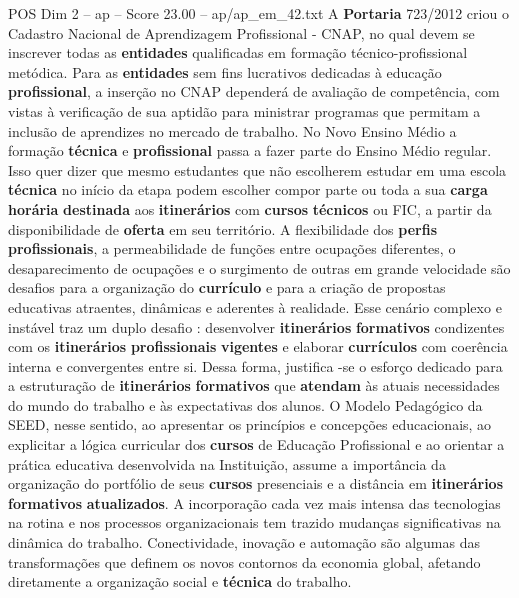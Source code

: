 \begin{textsample}{POS Dim 2 – ap – Score 23.00 – ap/ap\_em\_42.txt}  \label{ex:f2_pos_146}
A \textbf{Portaria} 723/2012 criou o Cadastro Nacional de Aprendizagem Profissional - CNAP, no qual devem se inscrever todas as \textbf{entidades} qualificadas em formação técnico-profissional metódica.
Para as \textbf{entidades} sem fins lucrativos dedicadas à educação \textbf{profissional}, a inserção no CNAP dependerá de avaliação de competência, com vistas à verificação de sua aptidão para ministrar programas que permitam a inclusão de aprendizes no mercado de trabalho.
No Novo Ensino Médio a formação \textbf{técnica} e \textbf{profissional} passa a fazer parte do Ensino Médio regular.
Isso quer dizer que mesmo estudantes que não escolherem estudar em uma escola \textbf{técnica} no início da etapa podem escolher compor parte ou toda a sua \textbf{carga} \textbf{horária} \textbf{destinada} aos \textbf{itinerários} com \textbf{cursos} \textbf{técnicos} ou FIC, a partir da disponibilidade de \textbf{oferta} em seu território.
A flexibilidade dos \textbf{perfis} \textbf{profissionais}, a permeabilidade de funções entre ocupações diferentes, o desaparecimento de ocupações e o surgimento de outras em grande velocidade são desafios para a organização do \textbf{currículo} e para a criação de propostas educativas atraentes, dinâmicas e aderentes à realidade.
Esse cenário complexo e instável traz um duplo desafio : desenvolver \textbf{itinerários} \textbf{formativos} condizentes com os \textbf{itinerários} \textbf{profissionais} \textbf{vigentes} e elaborar \textbf{currículos} com coerência interna e convergentes entre si.
Dessa forma, justifica -se o esforço dedicado para a estruturação de \textbf{itinerários} \textbf{formativos} que \textbf{atendam} às atuais necessidades do mundo do trabalho e às expectativas dos alunos.
O Modelo Pedagógico da SEED, nesse sentido, ao apresentar os princípios e concepções educacionais, ao explicitar a lógica curricular dos \textbf{cursos} de Educação Profissional e ao orientar a prática educativa desenvolvida na Instituição, assume a importância da organização do portfólio de seus \textbf{cursos} presenciais e a distância em \textbf{itinerários} \textbf{formativos} \textbf{atualizados}.
A incorporação cada vez mais intensa das tecnologias na rotina e nos processos organizacionais tem trazido mudanças significativas na dinâmica do trabalho.
Conectividade, inovação e automação são algumas das transformações que definem os novos contornos da economia global, afetando diretamente a organização social e \textbf{técnica} do trabalho.

\end{textsample}
